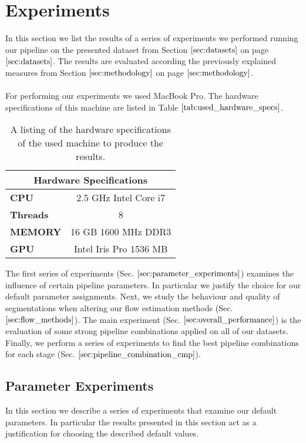 \section{Experiments}
\label{sec:experiments}
In this section we list the results of a series of experiments we performed running our pipeline on the presented dataset from Section $\ref{sec:datasets}$ on page $\pageref{sec:datasets}$. The results are evaluated according the previously explained measures from Section $\ref{sec:methodology}$ on page $\pageref{sec:methodology}$. \\ \\
For performing our experiments we used MacBook Pro. The hardware specifications of this machine are listed in Table $\ref{tab:used_hardware_specs}$. 
\begin{table}[H]
\centering
\begin{tabular}{|l|c|}
\hline
\multicolumn{2}{|c|}{\textbf{Hardware Specifications}} \\ \hline
\textbf{CPU} & 2.5 GHz Intel Core i7 \\ \hline
\textbf{Threads} & 8 \\ \hline
\textbf{MEMORY} & 16 GB 1600 MHz DDR3 \\ \hline
\textbf{GPU} & Intel Iris Pro 1536 MB \\ \hline
\end{tabular}
\caption{A listing of the hardware specifications of the used machine to produce the results.}
\label{tab:used_hardware_specs}
\end{table}
The first series of experiments (Sec. $\ref{sec:parameter_experiments}$) examines the influence of certain pipeline parameters. In particular we justify the choice for our default parameter assignments. Next, we study the behaviour and quality of segmentations when altering our flow estimation methods (Sec. $\ref{sec:flow_methods}$). The main experiment (Sec. $\ref{sec:overall_performance}$) is the evaluation of some strong pipeline combinations applied on all of our datasets. Finally, we perform a series of experiments to find the best pipeline combinations for each stage (Sec. $\ref{sec:pipeline_combination_cmp}$).

\subsection{Parameter Experiments}
\label{sec:parameter_experiments}
In this section we describe a series of experiments that examine our default parameters. In particular the results presented in this section act as a justification for choosing the described default values.

